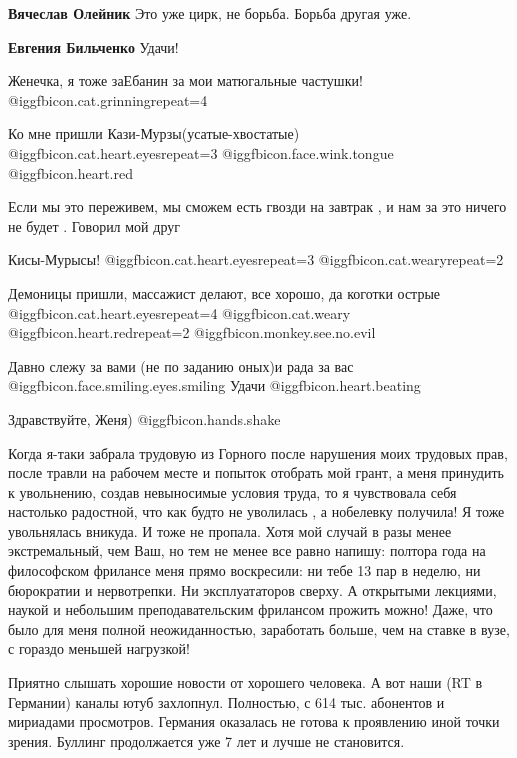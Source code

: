 \begin{itemize}
\begin{itemize}
\textbf{Вячеслав Олейник} Это уже цирк, не борьба. Борьба другая уже.

\textbf{Евгения Бильченко} Удачи!
\end{itemize} %

Женечка, я тоже заЕбанин за мои матюгальные частушки! @igg{fbicon.cat.grinning}{repeat=4} 

Ко мне пришли Кази-Мурзы(усатые-хвостатые) @igg{fbicon.cat.heart.eyes}{repeat=3}  @igg{fbicon.face.wink.tongue} @igg{fbicon.heart.red}

Если мы это переживем, мы сможем есть гвозди на завтрак , и нам за это ничего не будет . Говорил мой друг

Кисы-Мурысы! @igg{fbicon.cat.heart.eyes}{repeat=3}  @igg{fbicon.cat.weary}{repeat=2} 

Демоницы пришли, массажист делают, все хорошо, да коготки острые 
@igg{fbicon.cat.heart.eyes}{repeat=4}  @igg{fbicon.cat.weary}  @igg{fbicon.heart.red}{repeat=2} @igg{fbicon.monkey.see.no.evil} 

Давно слежу за вами (не по заданию оных)и рада за вас  @igg{fbicon.face.smiling.eyes.smiling} Удачи  @igg{fbicon.heart.beating} 

Здравствуйте, Женя)  @igg{fbicon.hands.shake} 


Когда я-таки забрала трудовую из Горного после нарушения моих трудовых прав,
после травли на рабочем месте и попыток отобрать мой грант, а меня принудить к
увольнению, создав невыносимые условия труда, то я чувствовала себя настолько
радостной, что как будто не уволилась , а нобелевку получила! Я тоже
увольнялась вникуда. И тоже не пропала. Хотя мой случай в разы менее
экстремальный, чем Ваш, но тем не менее все равно напишу: полтора года на
философском фрилансе меня прямо воскресили: ни тебе 13 пар в неделю, ни
бюрократии и нервотрепки. Ни эксплуататоров сверху. А открытыми лекциями,
наукой и небольшим преподавательским фрилансом прожить можно! Даже, что было
для меня полной неожиданностью, заработать больше, чем на ставке в вузе, с
гораздо меньшей нагрузкой!


Приятно слышать хорошие новости от хорошего человека. А вот наши (RT в
Германии) каналы ютуб захлопнул. Полностью, с 614 тыс. абонентов и мириадами
просмотров. Германия оказалась не готова к проявлению иной точки зрения.
Буллинг продолжается уже 7 лет и лучше не становится.



\end{itemize}
